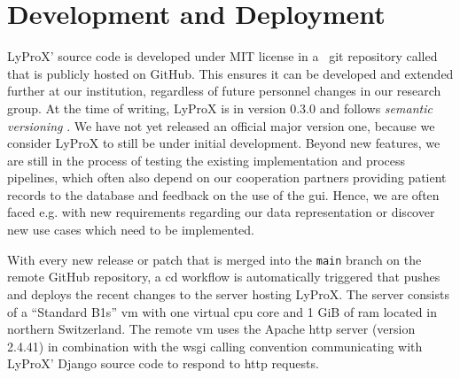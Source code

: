 \documentclass[\relativeRoot/main.tex]{subfiles}
\begin{document}
\section{Development and Deployment}
\label{sec:lyprox:dev}

LyProX' source code is developed under MIT license in a ~git \cite{torvalds_git_2022} repository called  that is publicly hosted on GitHub. This ensures it can be developed and extended further at our institution, regardless of future personnel changes in our research group. At the time of writing, LyProX is in version 0.3.0 and follows \emph{semantic versioning} \cite{preston-werner_semantic_nodate}. We have not yet released an official major version one, because we consider LyProX to still be under initial development. Beyond new features, we are still in the process of testing the existing implementation and process pipelines, which often also depend on our cooperation partners providing patient records to the database and feedback on the use of the \gls{gui}. Hence, we are often faced e.g. with new requirements regarding our data representation or discover new use cases which need to be implemented.

With every new release or patch that is merged into the \texttt{main} branch on the remote GitHub repository, a \acrlong{cd} workflow is automatically triggered that pushes and deploys the recent changes to the server hosting LyProX. The server consists of a  ``Standard B1s'' \acrlong{vm} with one virtual \acrshort{cpu} core and 1 GiB of \acrshort{ram} located in northern Switzerland. The remote \acrlong{vm} uses the Apache \acrshort{http} server (version 2.4.41) \cite{mccool_apache_nodate} in combination with the \acrshort{wsgi} calling convention \cite{eby_python_2010} communicating with LyProX' Django source code to respond to \acrshort{http} requests.
\end{document}

